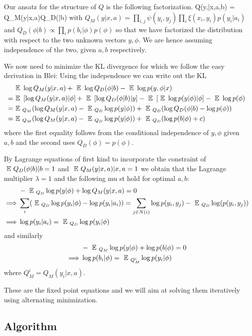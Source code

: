\documentclass{article} %
\begin{document}
Our ansatz for the structure of $Q$ is the following factorization.
\beqs
Q(y,\phi|x,a,b) = Q_M(y|x,a)Q_D(\phi|b) 
\eeqs
with $Q_M(y|x,a) = \prod_{i,j} \psi(y_i,y_j) \prod_i  \xi(x_i,y_i) p(y_i|a_i)$ and $Q_D(\phi|b) \propto \prod_i p(b_i|\phi) p(\phi)$ so that we have factorized the distribution with respect to the two unknown vectors $y, \phi$. We are hence assuming independence of the two, given $a,b$ respectively.

We now need to minimize the KL divergence for which we follow the easy derivation in Blei:
Using the independence we can write out the KL 
\begin{align*}
&\mbox{ }\mathbb{E}\mbox{ } \log Q_M(y|x,a) + \mbox{ }\mathbb{E}\mbox{ } \log Q_D(\phi|b) - \mbox{ }\mathbb{E}\mbox{ } \log p(y,\phi|x)\\
 = &\mbox{ }\mathbb{E}\mbox{ } \left[\log Q_M(y|x,a)|\phi \right] + \mbox{ }\mathbb{E}\mbox{ } \left[ \log Q_D(\phi|b) |y\right] - \mbox{ }\mathbb{E}\mbox{ } \left[\mbox{ }\mathbb{E}\mbox{ } \log p(y|\phi) |\phi \right]- \mbox{ }\mathbb{E}\mbox{ } \log p(\phi)\\
= &\mbox{ }\mathbb{E}\mbox{ }_{Q_M} (\log Q_M(y|x,a) - \mbox{ }\mathbb{E}\mbox{ }_{Q_D} \log p(y|\phi)) + \mbox{ }\mathbb{E}\mbox{ }_{Q_D} (\log Q_D(\phi|b) - \log p(\phi))\\
= &\mbox{ }\mathbb{E}\mbox{ }_{Q_M} (\log Q_M(y|x,a) - \mbox{ }\mathbb{E}\mbox{ }_{Q_D} \log p(y|\phi)) + \mbox{ }\mathbb{E}\mbox{ }_{Q_D} (\log p(b|\phi) + c)
\end{align*}
where the first equality follows from the conditional independence of $y,\phi$ given $a,b$ and the second uses $Q_D(\phi) = p(\phi)$.

By Lagrange equations of first kind to incorporate the constraint of $\mbox{ }\mathbb{E}\mbox{ } Q_D(\phi|b) |b = 1$ and $\mbox{ }\mathbb{E}\mbox{ } Q_M(y|x,a) |x,a = 1$  we obtain that the Lagrange multiplier $\lambda = 1$ and the following mu
st hold for optimal $a,b$:
\begin{align*}
& -\mbox{ }\mathbb{E}\mbox{ }_{Q_D} \log p(y|\phi) + \log Q_M(y|x,a) = 0\\
\implies  &\sum_i (\mbox{ }\mathbb{E}\mbox{ }_{Q_D}\log p(y_i|\phi) - \log p(y_i|a_i)) = \sum_{j\in N(i)} \log p(y_i,y_j) - \mbox{ }\mathbb{E}\mbox{ }_{Q_D} \log(p(y_i,y_j)) \\
\implies &\log p(y_i|a_i) = \mbox{ }\mathbb{E}\mbox{ }_{Q_D} \log p(y_i|\phi) 
\end{align*}
and similarly
\begin{align*}
&- \mbox{ }\mathbb{E}\mbox{ }_{Q_M} \log p(y|\phi) + \log p(b|\phi) = 0\\
\implies &\log p(b_i|\phi) = \mbox{ }\mathbb{E}\mbox{ }_{Q^i_M} \log p(y_i|\phi)  
\end{align*}
where $Q_M^i = Q_M(y_i|x,a)$.

These are the fixed point equations and we will aim at solving them iteratively using alternating minimization. 

\subsection{Algorithm}
\end{document}
